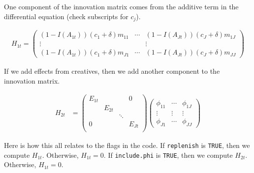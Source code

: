 \documentclass[letter,11pt]{article}
\begin{document}
One component of the innovation matrix comes from the additive term in
the differential equation (check subscripts for $c_j$).

\begin{align}
  \label{eq:H1t}
  H_{1t}=\begin{pmatrix}
(1-I(A_{1t}))(c_1+\delta)m_{11}&\cdots&(1-I(A_{Jt}))(c_J+\delta)m_{1J}\\
\vdots&&\vdots\\
(1-I(A_{1t}))(c_1+\delta)m_{J1}&\cdots&(1-I(A_{Jt}))(c_J+\delta)m_{JJ}
\end{pmatrix}
\end{align}

If we add effects from creatives, then we add another component to the
innovation matrix.

\begin{align}
  \label{eq:H2t}
    H_{2t}&= \begin{pmatrix}
      E_{1t}&&&0\\
&E_{2t}\\
&&\ddots\\
0&&&E_{Jt}\\
  \end{pmatrix}
\begin{pmatrix}
\phi_{11}&\cdots&\phi_{1J}\\
\vdots&\vdots&\vdots\\
\phi_{J1}&\cdots&\phi_{JJ}
\end{pmatrix}
\end{align}

Here is how this all relates to the flags in the code.  If
\texttt{replenish} is \texttt{TRUE}, then we compute $H_{1t}$.
Otherwise, $H_{1t}=0$.    If
\texttt{include.phi} is \texttt{TRUE}, then we compute $H_{2t}$.
Otherwise, $H_{1t}=0$.  
\end{document}
